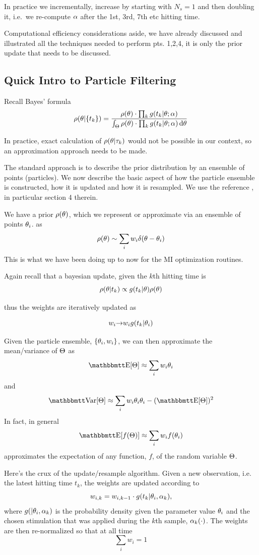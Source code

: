 In practice we incrementally, increase by starting with $N_s=1$ and then
doubling it, i.e.\ we re-compute $\alpha$ after the 1st, 3rd, 7th etc hitting time.

Computational efficiency considerations aside, we have already discussed and
illustrated all the techniques needed to perform pts. 1,2,4, it is
only the prior update that needs to be discussed.

\subsection{Quick Intro to Particle Filtering}
Recall Bayes' formula
$$
\rho({ \theta}| \{t_k\} ) = 
\frac{  \rho({ \theta}) \cdot \prod_k g(t_k|{ \theta} ; \alpha) }
	 { \int_{\Theta}  \rho({ \theta}) \cdot \prod_k g(t_k|{ \theta} ; \alpha)  \, \mathrm{d} { \theta}}
$$

In practice, exact calculation of $\rho({ \theta}|{\tau}_k)$ would not be possible in our
context, so an approximation approach needs to be made.

The standard approach is to describe the prior distribution by an ensemble of
points (particles). We now describe the basic aspect of how the particle
ensemble is constructed, how it is updated and how it is resampled. We use the
reference \cite{Granade2012}, in particular section 4 therein.

We have a prior
$ \rho({ \theta})$, which we represent or approximate  via an ensemble of points ${ \theta}_i$. as 
$$ \rho({ \theta}) \sim \sum_i w_i \delta({ \theta}-{ \theta}_i)$$
This is what we have been doing up to now for the MI optimization routines.

Again recall that a bayesian update, given the $k$th hitting time is
$$ \rho({ \theta}|t_k) \propto g(t_k|{ \theta})\rho({ \theta})$$

thus the weights are iteratively updated as 

$$w_i {\rightarrow} w_i g(t_k|{ \theta}_i)$$

Given the particle ensemble, $\{{ \theta}_i, w_i\}$, we can  then approximate the
mean/variance of ${\Theta}$ as
$$ \Exp[\Th] \approx \sum_i w_i \th_i$$
and 
$$ \Var[\Th] \approx \sum_i w_i \th_i \th_i - (\Exp[\Th])^2$$
In fact, in general 
$$\Exp[f(\Th)]\approx\sum_i w_i f(\th_i)$$ approximates the expectation of any
function, $f$, of the random variable ${\Theta}$.

Here's the crux of the update/resample algorithm. Given a new observation, i.e.
the latest hitting time $t_k$, the weights are updated according to
$$ w_{i,k} = w_{i,k-1}\cdot g(t_k| { \theta}_i, \alpha_k),$$where $g(|{ \theta}_i, \alpha_k)$ is
the probability density given the parameter value ${ \theta}_i$ and the chosen
stimulation that was applied during the $k$th sample, $\alpha_k(\cdot)$.
The weights are then re-normalized so that at all time $$\sum_i w_i = 1$$ 

